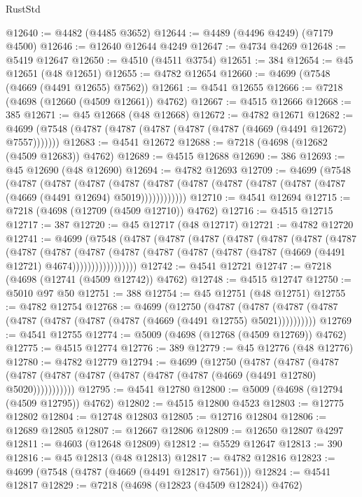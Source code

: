 \begin{lexlean}{RustStd}
\begin{coremodule}
@12640 := @4482 (@4485 @3652)
@12644 := @4489 (@4496 @4249) (@7179 @4500)
@12646 := @12640 @12644 @4249
@12647 := @4734 @4269
@12648 := @5419 @12647
@12650 := @4510 (@4511 @3754)
@12651 := 384
@12654 := @45 @12651 (@48 @12651)
@12655 := @4782 @12654
@12660 := @4699 (@7548 (@4669 (@4491 @12655) @7562))
@12661 := @4541 @12655
@12666 := @7218 (@4698 (@12660 (@4509 @12661)) @4762)
@12667 := @4515 @12666
@12668 := 385
@12671 := @45 @12668 (@48 @12668)
@12672 := @4782 @12671
@12682 := @4699 (@7548 (@4787 (@4787 (@4787 (@4787 (@4787 (@4669 (@4491 @12672) @7557)))))))
@12683 := @4541 @12672
@12688 := @7218 (@4698 (@12682 (@4509 @12683)) @4762)
@12689 := @4515 @12688
@12690 := 386
@12693 := @45 @12690 (@48 @12690)
@12694 := @4782 @12693
@12709 := @4699
    (@7548
      (@4787
        (@4787
          (@4787
            (@4787 (@4787 (@4787 (@4787 (@4787 (@4787 (@4787 (@4669 (@4491 @12694) @5019))))))))))))
@12710 := @4541 @12694
@12715 := @7218 (@4698 (@12709 (@4509 @12710)) @4762)
@12716 := @4515 @12715
@12717 := 387
@12720 := @45 @12717 (@48 @12717)
@12721 := @4782 @12720
@12741 := @4699
    (@7548
      (@4787
        (@4787
          (@4787
            (@4787
              (@4787
                (@4787
                  (@4787
                    (@4787
                      (@4787
                        (@4787
                          (@4787
                            (@4787 (@4787 (@4787 (@4787 (@4669 (@4491 @12721) @4674)))))))))))))))))
@12742 := @4541 @12721
@12747 := @7218 (@4698 (@12741 (@4509 @12742)) @4762)
@12748 := @4515 @12747
@12750 := @5010 @97 @50
@12751 := 388
@12754 := @45 @12751 (@48 @12751)
@12755 := @4782 @12754
@12768 := @4699
    (@12750
      (@4787 (@4787 (@4787 (@4787 (@4787 (@4787 (@4787 (@4787 (@4669 (@4491 @12755) @5021))))))))))
@12769 := @4541 @12755
@12774 := @5009 (@4698 (@12768 (@4509 @12769)) @4762)
@12775 := @4515 @12774
@12776 := 389
@12779 := @45 @12776 (@48 @12776)
@12780 := @4782 @12779
@12794 := @4699
    (@12750
      (@4787
        (@4787
          (@4787 (@4787 (@4787 (@4787 (@4787 (@4787 (@4787 (@4669 (@4491 @12780) @5020)))))))))))
@12795 := @4541 @12780
@12800 := @5009 (@4698 (@12794 (@4509 @12795)) @4762)
@12802 := @4515 @12800 @4523
@12803 := @12775 @12802
@12804 := @12748 @12803
@12805 := @12716 @12804
@12806 := @12689 @12805
@12807 := @12667 @12806
@12809 := @12650 @12807 @4297
@12811 := @4603 (@12648 @12809)
@12812 := @5529 @12647
@12813 := 390
@12816 := @45 @12813 (@48 @12813)
@12817 := @4782 @12816
@12823 := @4699 (@7548 (@4787 (@4669 (@4491 @12817) @7561)))
@12824 := @4541 @12817
@12829 := @7218 (@4698 (@12823 (@4509 @12824)) @4762)

\end{coremodule}
\end{lexlean}

